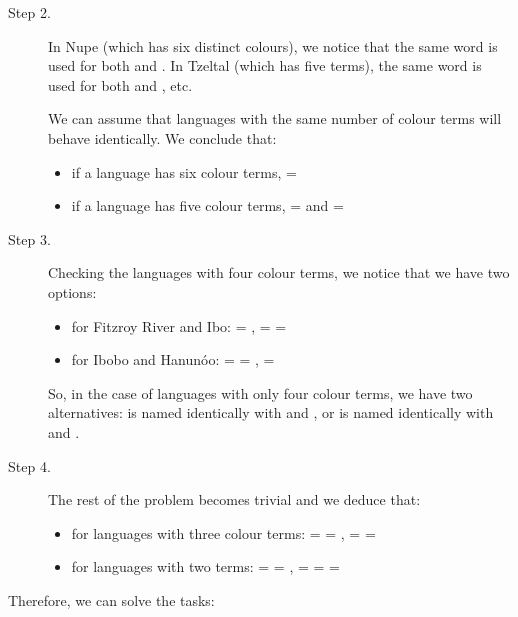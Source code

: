 \begin{refsection}
\begin{mysolution}
\begin{description}
\item[{Step 2.}] In Nupe (which has six distinct colours), we notice that the same word is used for both  and . In Tzeltal (which has five terms), the same word is used for both  and , etc.

We can assume that languages with the same number of colour terms will behave identically. We conclude that:

\begin{itemize}
    \item if a language has six colour terms,  = 
    \item if a language has five colour terms,  =  and  = 
\end{itemize}

\item[{Step 3.}] Checking the languages with four colour terms, we notice that we have two options:

\begin{itemize}
    \item for Fitzroy River and Ibo:  = ,  =  = 
    \item for Ibobo and Hanunóo:  =  = ,  = 
    \end{itemize}

 So, in the case of languages with only four colour terms, we have two alternatives:  is named identically with  and , or  is named identically with  and .

\item[{Step 4.}] The rest of the problem becomes trivial and we deduce that:

\begin{itemize}
\item for languages with three colour terms:  =  = ,  =  = 
\item for languages with two terms:  =  = ,  =  =  = 
\end{itemize}
\end{description}

 Therefore, we can solve the tasks:


\end{mysolution}
\end{refsection}
